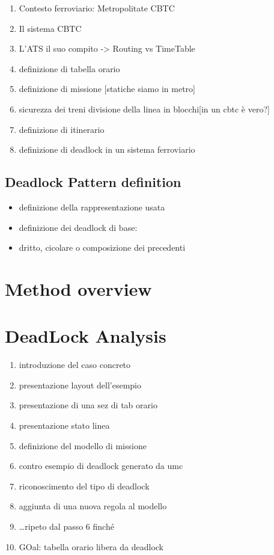 \documentclass{ewic}
\begin{document}
\begin{enumerate}
\item Contesto ferroviario: Metropolitate CBTC
\item Il sistema CBTC
\item L'ATS il suo compito -> Routing vs TimeTable
\item definizione di tabella orario 
\item definizione di missione [statiche siamo in metro]
\item sicurezza dei treni divisione della linea in blocchi[in un cbtc è vero?]
\item definizione di itinerario 
\item definizione di deadlock in un sistema ferroviario
\end{enumerate}



\subsection{Deadlock Pattern definition}
\begin{itemize}
\item definizione della rappresentazione usata
\item definizione dei deadlock di base:
\item dritto, cicolare o composizione dei precedenti
\end{itemize}

\section{Method overview}


\section{DeadLock Analysis}
\begin{enumerate}
\item introduzione del caso concreto
\item presentazione layout dell'esempio
\item presentazione di una sez di tab orario
\item presentazione stato linea
\item definizione del modello di missione
\item contro esempio di deadlock generato da umc
\item riconoscimento del tipo di deadlock
\item aggiunta di una nuova regola al modello
\item \ldots ripeto dal passo 6 finch\'{e}
\item GOal: tabella orario libera da deadlock
\end{enumerate}
%
\end{document}
